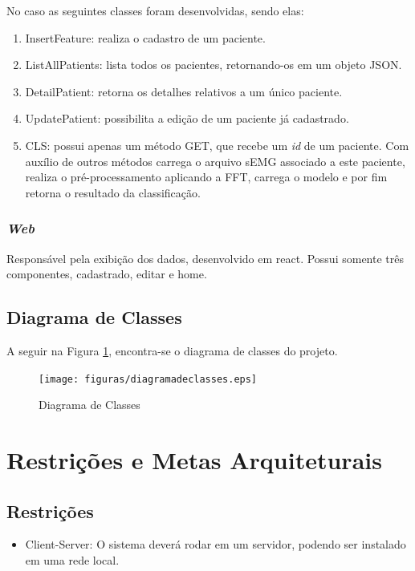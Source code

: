 \begin{anexosenv}
    No caso as seguintes classes foram desenvolvidas, sendo elas:
    \begin{enumerate}
        \item InsertFeature: realiza o cadastro de um paciente.
        \item ListAllPatients: lista todos os pacientes, retornando-os em um objeto JSON.
        \item DetailPatient: retorna os detalhes relativos a um único paciente.
        \item UpdatePatient: possibilita a edição de um paciente já cadastrado.
        \item CLS: possui apenas um método GET, que recebe um \textit{id} de um paciente. Com auxílio de outros métodos carrega o arquivo sEMG associado a este paciente, realiza o pré-processamento aplicando a FFT, carrega o modelo e por fim retorna o resultado da classificação.
    \end{enumerate}

    \subsubsection{\textit{Web}}
    Responsável pela exibição dos dados, desenvolvido em react. Possui somente três componentes, cadastrado, editar e home.

   \subsection{Diagrama de Classes}
   A seguir na Figura \ref{diagramadeclasses}, encontra-se o diagrama de classes do projeto.
   \begin{figure}[!htb]
        \centering
        \texttt{[image: figuras/diagramadeclasses.eps]}
        \caption{Diagrama de Classes}
        \label{diagramadeclasses}
   \end{figure}
  
    \section{Restrições e Metas Arquiteturais}
    \subsection{Restrições}
    \begin{itemize}
        \item Client-Server: O sistema deverá rodar em um servidor, podendo ser instalado em uma rede local.
    \end{itemize}
  


\end{anexosenv}
